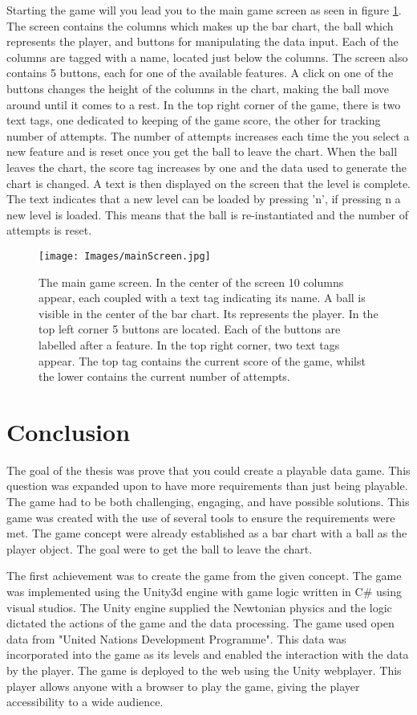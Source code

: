 \documentclass[a4paper,11pt]{article}
\begin{document}
Starting the game will you lead you to the main game screen as seen in figure \ref{fig:game}. The screen contains the columns which makes up the bar chart, the ball which represents the player, and buttons for manipulating the data input. Each of the columns are tagged with a name, located just below the columns. The screen also contains 5 buttons, each for one of the available features. A click on one of the buttons changes the height of the columns in the chart, making the ball move around until it comes to a rest. In the top right corner of the game, there is two text tags, one dedicated to keeping of the game score, the other for tracking number of attempts. The number of attempts increases each time the you select a new feature and is reset once you get the ball to leave the chart. When the ball leaves the chart, the score tag increases by one and the data used to generate the chart is changed. A text is then displayed on the screen that the level is complete. The text indicates that a new level can be loaded by pressing 'n', if pressing n a new level is loaded. This means that the ball is re-instantiated and the number of attempts is reset. 
\begin{figure}[h]
    \centering
    \texttt{[image: Images/mainScreen.jpg]}
    \caption{The main game screen. In the center of the screen 10 columns appear, each coupled with a text tag indicating its name. A ball is visible in the center of the bar chart. Its represents the player. In the top left corner 5 buttons are located. Each of the buttons are labelled after a feature. In the top right corner, two text tags appear. The top tag contains the current score of the game, whilst the lower contains the current number of attempts.}
    \label{fig:game}
\end{figure}

\section{Conclusion}
The goal of the thesis was prove that you could create a playable data game. This question was expanded upon to have more requirements than just being playable. The game had to be both challenging, engaging, and have possible solutions. 
This game was created with the use of several tools to ensure the requirements were met. The game concept were already established as a bar chart with a ball as the player object. The goal were to get the ball to leave the chart. 

The first achievement was to create the game from the given concept. The game was implemented using the Unity3d engine with game logic written in C\# using visual studios. The Unity engine supplied the Newtonian physics and the logic dictated the actions of the game and the data processing.
The game used open data from "United Nations Development Programme". This data was incorporated into the game as its levels and enabled the interaction with the data by the player. 
The game is deployed to the web using the Unity webplayer. This player allows anyone with a browser to play the game, giving the player accessibility to a wide audience.
\end{document}

